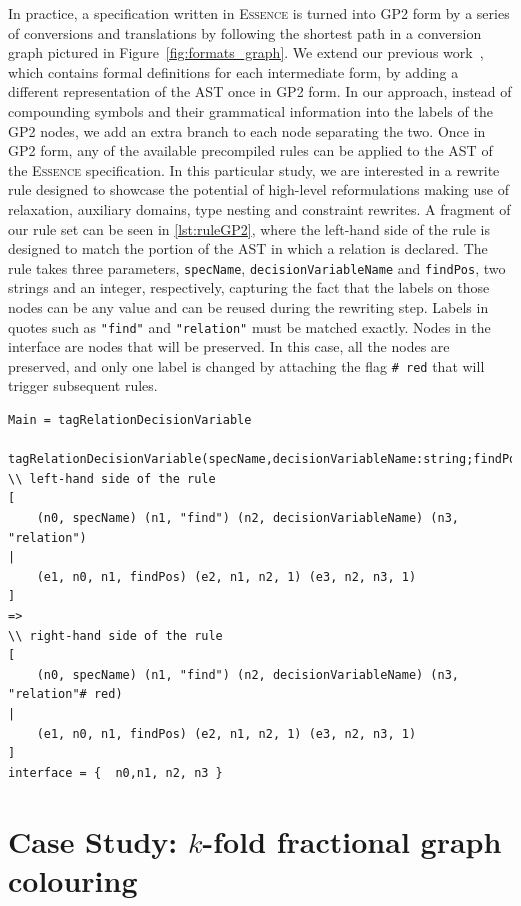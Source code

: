\documentclass[a4paper,UKenglish,cleveref,pdfa]{lipics-v2021}
\newcommand{\essence}{\textsc{Essence}\xspace}
\newcommand{\code}[1]{{\small\texttt{{#1}}}}
\begin{document}
In practice, a specification written in \essence is turned into GP2 form by a series of conversions and translations by following the shortest path in a conversion graph pictured in Figure~\ref{fig:formats_graph}. We extend our previous work~\cite{icgt2024},
which contains formal definitions for each intermediate form, by adding a different representation of the AST once in GP2 form. In our approach, instead of compounding symbols and their grammatical information into the labels of the GP2 nodes, we add an extra branch to each node separating the two. Once in GP2 form, any of the available precompiled rules can be applied to the AST of the \essence specification. In this particular study, we are interested in a rewrite rule designed to showcase the potential of high-level reformulations making use of relaxation, auxiliary domains, type nesting and constraint rewrites.
A fragment of our rule set can be seen in \cref{lst:ruleGP2}, where the left-hand side of the rule is designed to match the portion of the AST in which a relation is declared. The rule takes three parameters, \code{specName}, \code{decisionVariableName} and \code{findPos}, two strings and an integer, respectively, capturing the fact that the labels on those nodes can be any value and can be reused during the rewriting step. Labels in quotes such as \code{"find"} and \code{"relation"} must be matched exactly. Nodes in the interface are nodes that will be preserved. In this case, all the nodes are preserved, and only one label is changed by attaching the flag \code{\# red} that will trigger subsequent rules.

\begin{lstlisting}[caption={Tagging a decision variable node implemented in GP2.},label={lst:ruleGP2}]
Main = tagRelationDecisionVariable

tagRelationDecisionVariable(specName,decisionVariableName:string;findPos,n:int)
\\ left-hand side of the rule
[ 
    (n0, specName) (n1, "find") (n2, decisionVariableName) (n3, "relation")
|
    (e1, n0, n1, findPos) (e2, n1, n2, 1) (e3, n2, n3, 1)
]
=>
\\ right-hand side of the rule
[
    (n0, specName) (n1, "find") (n2, decisionVariableName) (n3, "relation"# red)
|
    (e1, n0, n1, findPos) (e2, n1, n2, 1) (e3, n2, n3, 1)
]
interface = {  n0,n1, n2, n3 }
\end{lstlisting}

\section{Case Study: \texorpdfstring{$k$-fold}{k-fold} fractional graph colouring}
\end{document}
